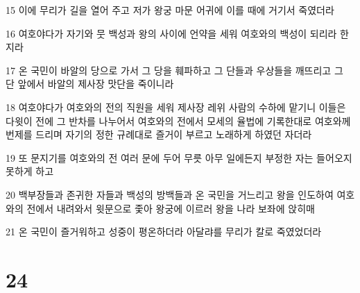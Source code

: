 \par 15 이에 무리가 길을 열어 주고 저가 왕궁 마문 어귀에 이를 때에 거기서 죽였더라
\par 16 여호야다가 자기와 뭇 백성과 왕의 사이에 언약을 세워 여호와의 백성이 되리라 한지라
\par 17 온 국민이 바알의 당으로 가서 그 당을 훼파하고 그 단들과 우상들을 깨뜨리고 그 단 앞에서 바알의 제사장 맛단을 죽이니라
\par 18 여호야다가 여호와의 전의 직원을 세워 제사장 레위 사람의 수하에 맡기니 이들은 다윗이 전에 그 반차를 나누어서 여호와의 전에서 모세의 율법에 기록한대로 여호와께 번제를 드리며 자기의 정한 규례대로 즐거이 부르고 노래하게 하였던 자더라
\par 19 또 문지기를 여호와의 전 여러 문에 두어 무릇 아무 일에든지 부정한 자는 들어오지 못하게 하고
\par 20 백부장들과 존귀한 자들과 백성의 방백들과 온 국민을 거느리고 왕을 인도하여 여호와의 전에서 내려와서 윗문으로 좇아 왕궁에 이르러 왕을 나라 보좌에 앉히매
\par 21 온 국민이 즐거워하고 성중이 평온하더라 아달랴를 무리가 칼로 죽였었더라

\chapter{24}

